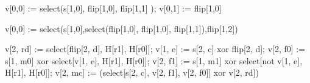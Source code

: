 \begin{example}
  \label{example-lambda-obliv}

  \begin{verbatimtab}
v[0,0] := select(s[1,0], flip[1,0], flip[1,1] );
v[0,1] := flip[1,0]
\end{verbatimtab}

\begin{verbatimtab}
v[0,0] := select(s[1,0],select(flip[1,0], flip[1,0], flip[1,1]),flip[1,2])
\end{verbatimtab}
\end{example}

\begin{example}
  \label{example-lambda-OT}

\begin{verbatimtab}
v[2, rd] := select[flip[2, d], H[r1], H[r0]];
v[1, e] := s[2, c] xor flip[2, d];
v[2, f0] := s[1, m0] xor select[v[1, e], H[r1], H[r0]];
v[2, f1] := s[1, m1] xor select[not v[1, e], H[r1], H[r0]];
v[2, mc] := (select[s[2, c], v[2, f1], v[2, f0]] xor v[2, rd])
\end{verbatimtab}
\end{example}


